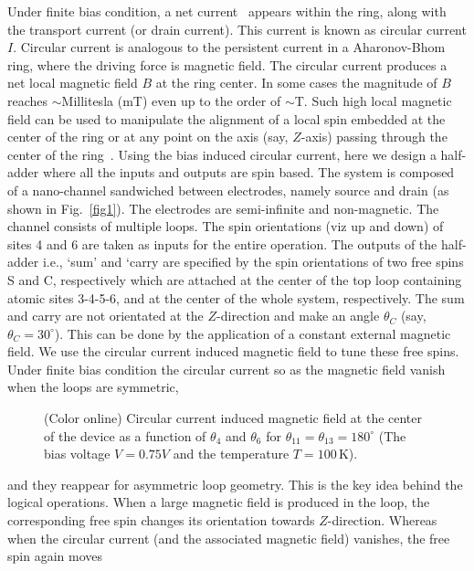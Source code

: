 \documentclass[prb,aps,twocolumn,amsmath,amssymb,floatfix,superscriptaddress]{revtex4}
\begin{document}
Under finite bias condition, a net current~\cite{ref10,ref11,ref12,ref13,ref14}
appears within the ring, along with the transport current (or drain current). This current
is known as circular current $I$. Circular current is analogous to the persistent current
in a Aharonov-Bhom ring, where the driving force is magnetic field. The circular current
produces a net local magnetic field $B$ at the ring center. In some cases
the magnitude of $B$ reaches $\sim$Millitesla (mT) even up to the order of $\sim$T. Such high
local magnetic field can be used to manipulate the alignment of a local spin embedded at
the center of the ring or at any point on the axis (say, $Z$-axis) passing through the
center of the ring~\cite{ref11,ref13,ref15}. Using the bias induced
circular current, here we design a half-adder where all the inputs and outputs are spin based.
The system is composed of a nano-channel sandwiched between electrodes, namely source and
drain (as shown in Fig.~\ref{fig1}). The electrodes are semi-infinite and non-magnetic.
The channel consists of multiple loops. The spin orientations (viz up and down) of sites 4 and
6 are taken as inputs for the entire operation. The outputs of the half-adder i.e., `sum'
and `carry are specified by the spin orientations of two free spins S and C, respectively
which are attached at the center of the top loop containing atomic sites 3-4-5-6, and at
the center of the whole system, respectively. The sum and carry are not
orientated at the $Z$-direction and make an angle $\theta_C$ (say, $\theta_C = 30^{\circ}$).
This can be done by the application of a constant external magnetic field. We use the
circular current induced magnetic field to tune these free spins. Under finite bias
condition the circular current so as the magnetic field vanish when the loops are symmetric,
\begin{figure}[ht]
{\centering{}\par}
\caption{(Color online) Circular current induced magnetic field at the center
of the device as a function of $\theta_4$ and $\theta_6$ for $\theta_{11} = \theta_{13} = 180^{\circ}$
(The bias voltage $V = 0.75 V$ and the temperature $T = 100\,$K).}
\label{mag}
\end{figure}
and they reappear for asymmetric loop geometry. This is the key idea behind the logical
operations. When a large magnetic field is produced in the loop, the
corresponding free spin changes its orientation towards $Z$-direction. Whereas when
the circular current (and the associated magnetic field) vanishes, the free spin again moves
\end{document}
